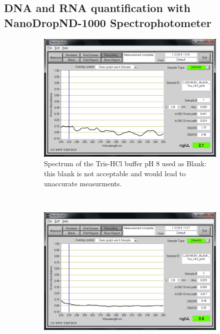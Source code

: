 \subsection{DNA and RNA quantification with NanoDrop\cR ND-1000 Spectrophotometer}
\label{task:20180301_cj1}

\begin{figure}[H] %
    \centering
    \caption{NanoDrop spectra for DNA and RNA isolated with AllPrep Mini Kit}
    \label{fig:CJ20180301}
    \begin{subfigure}[b]{0.49\textwidth}
        \includegraphics[width=\textwidth]{graphics/screenshots/CJ20180301_BLANK1.png}
        \caption{Spectrum of the Tris-HCl buffer pH 8 used as Blank: this blank is not acceptable and would lead to unaccurate measurments.}
        \label{sfig:CJ20180301_BLANK1}
    \end{subfigure}
    \\
    \begin{subfigure}[b]{0.49\textwidth}
        \includegraphics[width=\textwidth]{graphics/screenshots/CJ20180301_BLANK_Tris_HCl_pH8.png}

\end{subfigure}
\end{figure}
